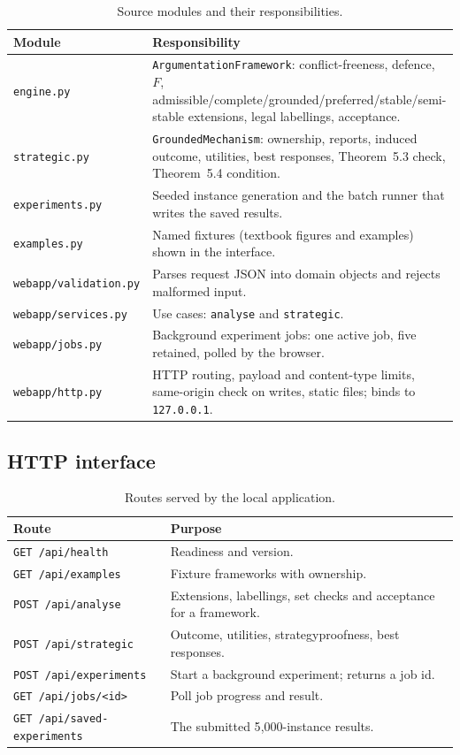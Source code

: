 \documentclass[11pt,a4paper]{article}
\newcommand{\file}[1]{\texttt{#1}}
\begin{document}
\begin{table}[H]
\centering
\caption{Source modules and their responsibilities.}
\label{tab:modules}
\small
\begin{tabular}{@{}p{4.3cm}p{10.2cm}@{}}
\toprule
Module & Responsibility \\
\midrule
\file{engine.py} & \texttt{ArgumentationFramework}: conflict-freeness, defence, $F$, admissible/complete/grounded/preferred/stable/semi-stable extensions, legal labellings, acceptance. \\
\file{strategic.py} & \texttt{GroundedMechanism}: ownership, reports, induced outcome, utilities, best responses, Theorem~5.3 check, Theorem~5.4 condition. \\
\file{experiments.py} & Seeded instance generation and the batch runner that writes the saved results. \\
\file{examples.py} & Named fixtures (textbook figures and examples) shown in the interface. \\
\file{webapp/validation.py} & Parses request JSON into domain objects and rejects malformed input. \\
\file{webapp/services.py} & Use cases: \texttt{analyse} and \texttt{strategic}. \\
\file{webapp/jobs.py} & Background experiment jobs: one active job, five retained, polled by the browser. \\
\file{webapp/http.py} & HTTP routing, payload and content-type limits, same-origin check on writes, static files; binds to \texttt{127.0.0.1}. \\
\bottomrule
\end{tabular}
\end{table}

\subsection{HTTP interface}
\begin{table}[H]
\centering
\caption{Routes served by the local application.}
\small
\begin{tabular}{@{}p{4.8cm}p{9.7cm}@{}}
\toprule
Route & Purpose \\
\midrule
\texttt{GET /api/health} & Readiness and version. \\
\texttt{GET /api/examples} & Fixture frameworks with ownership. \\
\texttt{POST /api/analyse} & Extensions, labellings, set checks and acceptance for a framework. \\
\texttt{POST /api/strategic} & Outcome, utilities, strategyproofness, best responses. \\
\texttt{POST /api/experiments} & Start a background experiment; returns a job id. \\
\texttt{GET /api/jobs/<id>} & Poll job progress and result. \\
\texttt{GET /api/saved-experiments} & The submitted 5{,}000-instance results. \\
\bottomrule
\end{tabular}
\end{table}
\end{document}
